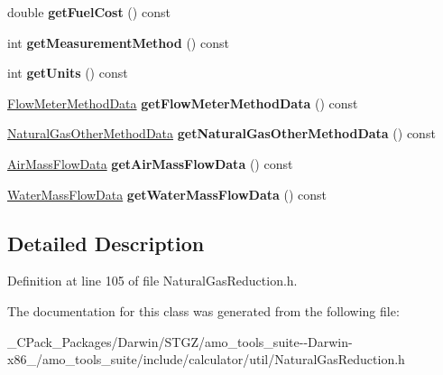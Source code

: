\begin{DoxyCompactItemize}
\item 
\mbox{\label{class_natural_gas_reduction_input_a3a7d17dcb66d4f7c585e79e6bc4ea15a}} 
double {\bfseries get\+Fuel\+Cost} () const
\item 
\mbox{\label{class_natural_gas_reduction_input_addeaed7fa85f47fbb1249ed5b11c3c61}} 
int {\bfseries get\+Measurement\+Method} () const
\item 
\mbox{\label{class_natural_gas_reduction_input_aca31b58c9d95adf451fcfeaadd72cd0f}} 
int {\bfseries get\+Units} () const
\item 
\mbox{\label{class_natural_gas_reduction_input_a9ef559f0c33b772fb0c83611fcd0aeab}} 
\hyperlink{class_flow_meter_method_data}{Flow\+Meter\+Method\+Data} {\bfseries get\+Flow\+Meter\+Method\+Data} () const
\item 
\mbox{\label{class_natural_gas_reduction_input_a09e0822339309acc767a1877f6bc9b74}} 
\hyperlink{class_natural_gas_other_method_data}{Natural\+Gas\+Other\+Method\+Data} {\bfseries get\+Natural\+Gas\+Other\+Method\+Data} () const
\item 
\mbox{\label{class_natural_gas_reduction_input_ab39430a5c9662d3f50c34ec58fdeab59}} 
\hyperlink{class_air_mass_flow_data}{Air\+Mass\+Flow\+Data} {\bfseries get\+Air\+Mass\+Flow\+Data} () const
\item 
\mbox{\label{class_natural_gas_reduction_input_aefc4121d546c3e26e702008868a2f4a3}} 
\hyperlink{class_water_mass_flow_data}{Water\+Mass\+Flow\+Data} {\bfseries get\+Water\+Mass\+Flow\+Data} () const
\end{DoxyCompactItemize}


\subsection{Detailed Description}


Definition at line 105 of file Natural\+Gas\+Reduction.\+h.



The documentation for this class was generated from the following file\+:\begin{DoxyCompactItemize}
\item 
\+\_\+\+C\+Pack\+\_\+\+Packages/\+Darwin/\+S\+T\+G\+Z/amo\+\_\+tools\+\_\+suite-\/-\/\+Darwin-\/x86\+\_/amo\+\_\+tools\+\_\+suite/include/calculator/util/Natural\+Gas\+Reduction.\+h\end{DoxyCompactItemize}
